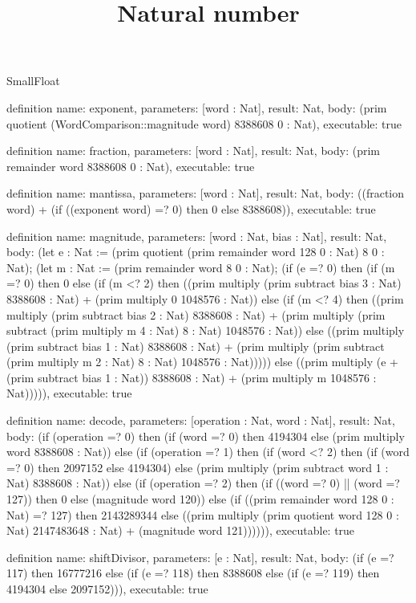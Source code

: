 \begin{lexlean}{SmallFloat}
\title{Natural number}
\begin{semanticmodule}
definition{
  name: exponent,
  parameters: [word : Nat],
  result: Nat,
  body: (prim quotient (WordComparison::magnitude word) 8388608 0 : Nat),
  executable: true
}

definition{
  name: fraction,
  parameters: [word : Nat],
  result: Nat,
  body: (prim remainder word 8388608 0 : Nat),
  executable: true
}

definition{
  name: mantissa,
  parameters: [word : Nat],
  result: Nat,
  body: ((fraction word) + (if ((exponent word) =? 0) then 0 else 8388608)),
  executable: true
}

definition{
  name: magnitude,
  parameters: [word : Nat, bias : Nat],
  result: Nat,
  body: (let e : Nat := (prim quotient (prim remainder word 128 0 : Nat) 8 0 : Nat); (let m : Nat := (prim remainder word 8 0 : Nat); (if (e =? 0) then (if (m =? 0) then 0 else (if (m <? 2) then ((prim multiply (prim subtract bias 3 : Nat) 8388608 : Nat) + (prim multiply 0 1048576 : Nat)) else (if (m <? 4) then ((prim multiply (prim subtract bias 2 : Nat) 8388608 : Nat) + (prim multiply (prim subtract (prim multiply m 4 : Nat) 8 : Nat) 1048576 : Nat)) else ((prim multiply (prim subtract bias 1 : Nat) 8388608 : Nat) + (prim multiply (prim subtract (prim multiply m 2 : Nat) 8 : Nat) 1048576 : Nat))))) else ((prim multiply (e + (prim subtract bias 1 : Nat)) 8388608 : Nat) + (prim multiply m 1048576 : Nat))))),
  executable: true
}

definition{
  name: decode,
  parameters: [operation : Nat, word : Nat],
  result: Nat,
  body: (if (operation =? 0) then (if (word =? 0) then 4194304 else (prim multiply word 8388608 : Nat)) else (if (operation =? 1) then (if (word <? 2) then (if (word =? 0) then 2097152 else 4194304) else (prim multiply (prim subtract word 1 : Nat) 8388608 : Nat)) else (if (operation =? 2) then (if ((word =? 0) || (word =? 127)) then 0 else (magnitude word 120)) else (if ((prim remainder word 128 0 : Nat) =? 127) then 2143289344 else ((prim multiply (prim quotient word 128 0 : Nat) 2147483648 : Nat) + (magnitude word 121)))))),
  executable: true
}

definition{
  name: shiftDivisor,
  parameters: [e : Nat],
  result: Nat,
  body: (if (e =? 117) then 16777216 else (if (e =? 118) then 8388608 else (if (e =? 119) then 4194304 else 2097152))),
  executable: true
}


\end{semanticmodule}
\end{lexlean}
